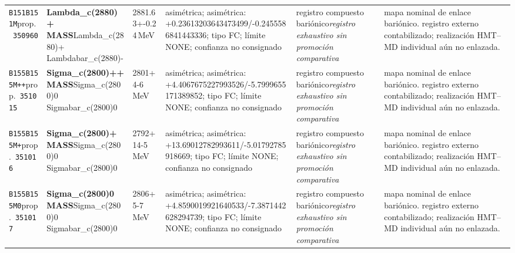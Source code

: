 \begin{landscape}
\begin{longtable}{L{1.85cm}L{4.45cm}L{2.35cm}L{4.05cm}L{3.35cm}L{7.15cm}}
\texttt{B151}\newline \texttt{B151M}\newline prop.\ \texttt{350960} & \textbf{Lambda\_\allowbreak{}c(2880)+ MASS}\newline Lambda\_\allowbreak{}c(2880)+ \textbar{}\allowbreak{} Lambdabar\_\allowbreak{}c(2880)- & 2881.63+-0.24\,MeV & asimétrica; asimétrica: +0.23613203643473499/-0.2455586841443336; tipo FC; límite NONE; confianza no consignado & registro compuesto bariónico\newline \emph{registro exhaustivo sin promoción comparativa} & mapa nominal de enlace bariónico. registro externo contabilizado; realización HMT--MD individual aún no enlazada. \\
\texttt{B155}\newline \texttt{B155M++}\newline prop.\ \texttt{351015} & \textbf{Sigma\_\allowbreak{}c(2800)++ MASS}\newline Sigma\_\allowbreak{}c(2800)0 \textbar{}\allowbreak{} Sigmabar\_\allowbreak{}c(2800)0 & 2801+4-6\,MeV & asimétrica; asimétrica: +4.4067675227993526/-5.7999655171389852; tipo FC; límite NONE; confianza no consignado & registro compuesto bariónico\newline \emph{registro exhaustivo sin promoción comparativa} & mapa nominal de enlace bariónico. registro externo contabilizado; realización HMT--MD individual aún no enlazada. \\
\texttt{B155}\newline \texttt{B155M+}\newline prop.\ \texttt{351016} & \textbf{Sigma\_\allowbreak{}c(2800)+ MASS}\newline Sigma\_\allowbreak{}c(2800)0 \textbar{}\allowbreak{} Sigmabar\_\allowbreak{}c(2800)0 & 2792+14-5\,MeV & asimétrica; asimétrica: +13.69012782993611/-5.01792785918669; tipo FC; límite NONE; confianza no consignado & registro compuesto bariónico\newline \emph{registro exhaustivo sin promoción comparativa} & mapa nominal de enlace bariónico. registro externo contabilizado; realización HMT--MD individual aún no enlazada. \\
\texttt{B155}\newline \texttt{B155M0}\newline prop.\ \texttt{351017} & \textbf{Sigma\_\allowbreak{}c(2800)0 MASS}\newline Sigma\_\allowbreak{}c(2800)0 \textbar{}\allowbreak{} Sigmabar\_\allowbreak{}c(2800)0 & 2806+5-7\,MeV & asimétrica; asimétrica: +4.8590019921640533/-7.3871442628294739; tipo FC; límite NONE; confianza no consignado & registro compuesto bariónico\newline \emph{registro exhaustivo sin promoción comparativa} & mapa nominal de enlace bariónico. registro externo contabilizado; realización HMT--MD individual aún no enlazada. \\

\end{longtable}
\end{landscape}
